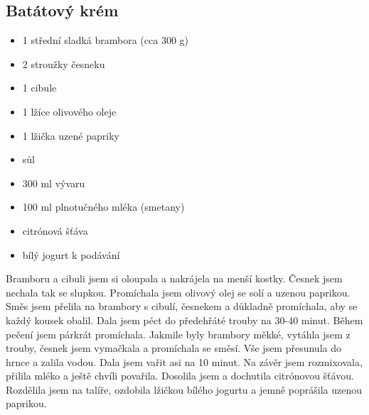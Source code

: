 \documentclass[10pt,a4paper]{article}
\newenvironment{myitemize}
{ \begin{itemize}
    \setlength{\itemsep}{0pt}
    \setlength{\parskip}{0pt}
    \setlength{\parsep}{0pt}     }
{ \end{itemize}                  }
\begin{document}
\subsection{Batátový krém}
\begin{minipage}[t]{0,5\textwidth}
\begin{myitemize} 
\item 1 střední sladká brambora (cca 300 g)
\item 2 stroužky česneku
\item 1 cibule
\item 1 lžíce olivového oleje
\item 1 lžička uzené papriky
\item sůl
\item 300 ml vývaru
\item 100 ml plnotučného mléka (smetany)
\item citrónová šťáva
\item bílý jogurt k podávání
\end{myitemize}
\end{minipage}
\begin{minipage}[t]{0,5\textwidth}
Bramboru a cibuli jsem si oloupala a nakrájela na menší kostky. Česnek jsem nechala tak se slupkou. Promíchala jsem olivový olej se solí a uzenou paprikou. Směs jsem přelila na brambory s cibulí, česnekem a důkladně promíchala, aby se každý kousek obalil. Dala jsem péct do předehřáté trouby na 30-40 minut. Během pečení jsem párkrát promíchala. Jakmile byly brambory měkké, vytáhla jsem z trouby, česnek jsem vymačkala a promíchala se směsí. Vše jsem přesunula do hrnce a zalila vodou. Dala jsem vařit asi na 10 minut. Na závěr jsem rozmixovala, přilila mléko a ještě chvíli povařila. Dosolila jsem a dochutila citrónovou šťávou. Rozdělila jsem na talíře, ozdobila lžičkou bílého jogurtu a jemně poprášila uzenou paprikou.
\end{minipage}
\end{document}
